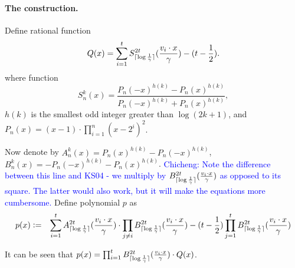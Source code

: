 \documentclass{article}
\DeclarePairedDelimiter\ceil{\lceil}{\rceil}
\newcommand{\cz}[1]{\textcolor{blue}{Chicheng: #1}}
\begin{document}
\paragraph{The construction.} Define rational function
\[
  Q(x) = \sum_{i=1}^t S_{\ceil{\log \frac 1 \gamma}}^{2t}(\frac{v_i \cdot x}{\gamma}) - (t - \frac 1 2).
\]
where function
\[
S_n^k(x) = \frac{P_n(-x)^{h(k)} - P_n(x)^{h(k)}}{P_n(-x)^{h(k)} + P_n(x)^{h(k)}},
\]
$h(k)$ is the smallest odd integer greater than $\log(2k+1)$, and $P_n(x) = (x - 1) \cdot \prod_{i=1}^n (x - 2^i)^2$.

Now denote by $A_n^k(x) = P_n(x)^{h(k)} - P_n(-x)^{h(k)}$, $B_n^k(x) = -P_n(-x)^{h(k)} - P_n(x)^{h(k)}$.
\cz{Note the difference between this line and KS04 - we multiply by $B_{\ceil{\log \frac 1 \gamma}}^{2t}(\frac{v_i \cdot x}\gamma)$ as opposed to its square. The latter would also work, but it will make the equations more cumbersome.}
Define polynomial $p$ as
\begin{eqnarray*}
  p(x) &:=& \sum_{i=1}^t A_{\ceil{\log \frac 1 \gamma}}^{2t}(\frac{v_i \cdot x}{\gamma}) \cdot \prod_{j \neq i} B_{\ceil{\log \frac 1 \gamma}}^{2t}(\frac{v_i \cdot x}{\gamma}) - (t-\frac12) \prod_{j=1}^t B_{\ceil{\log \frac 1 \gamma}}^{2t}(\frac{v_i \cdot x}{\gamma})
\end{eqnarray*}

It can be seen that
$p(x) = \prod_{i=1}^t B_{\ceil{\log \frac 1 \gamma}}^{2t}(\frac{v_i \cdot x}\gamma) \cdot Q(x)$.
\end{document}
